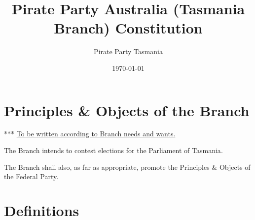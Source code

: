 \documentclass[a4paper,titlepage,8.5pt]{article}
\newcommand{\branch}{Tasmania}
\newcommand{\state}{Tasmania}
\newcommand{\legislature}{Parliament}
\begin{document}
\title{Pirate Party Australia ({\branch} Branch) Constitution}
\author{Pirate Party {\branch}}
\date{\today}
\maketitle


\tableofcontents
\thispagestyle{empty}
\newpage

\setcounter{page}{1}

\part{Principles \& Objects of the Branch}

\begin{framed}

 *** \underline{To be written according to Branch needs and wants.}

\end{framed}

The Branch intends to contest elections for the {\legislature} of {\state}.

The Branch shall also, as far as appropriate, promote the Principles \& Objects of the Federal Party.

\newpage

\part{Definitions}
\end{document}
